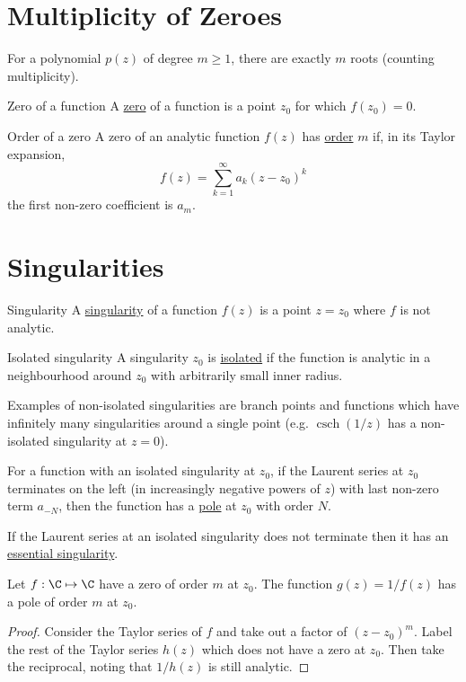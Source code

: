 \documentclass[../Main.tex]{subfiles}
\begin{document}
\section{Multiplicity of Zeroes}
\begin{theorem}
    For a polynomial $p(z)$ of degree $m \geq 1$, there are exactly $m$ roots (counting multiplicity).
    \label{thmFundamentalAlgebra}
\end{theorem}
\begin{definition}{Zero of a function}
    A \underline{zero} of a function is a point $z_0$ for which $f(z_0) = 0$.
\end{definition}
\begin{definition}{Order of a zero}
    A zero of an analytic function $f(z)$ has \underline{order} $m$ if, in its Taylor expansion,
    \begin{equation*}
        f(z) = \sum_{k=1}^{\infty} a_k (z - z_0)^k
    \end{equation*}
    the first non-zero coefficient is $a_m$.
\end{definition}
\section{Singularities}
\begin{definition}{Singularity}
    A \underline{singularity} of a function $f(z)$ is a point $z = z_0$ where $f$ is not analytic.
\end{definition}
\begin{definition}{Isolated singularity}
    A singularity $z_0$ is \underline{isolated} if the function is analytic in a neighbourhood around $z_0$ with arbitrarily small inner radius.
\end{definition}
Examples of non-isolated singularities are branch points and functions which have infinitely many singularities around a single point (e.g. $\operatorname{csch}(1/z)$ has a non-isolated singularity at $z = 0$).

For a function with an isolated singularity at $z_0$, if the Laurent series at $z_0$ terminates on the left (in increasingly negative powers of $z$) with last non-zero term $a_{-N}$, then the function has a \underline{pole} at $z_0$ with order $N$.

If the Laurent series at an isolated singularity does not terminate then it has an \underline{essential singularity}.
\begin{proposition}
    Let $f : \C \mapsto \C$ have a zero of order $m$ at $z_0$. The function $g(z) = 1 / f(z)$ has a pole of order $m$ at $z_0$.
    \label{propRecipSing}
\end{proposition}
\begin{proof}
    Consider the Taylor series of $f$ and take out a factor of $(z - z_0)^m$. Label the rest of the Taylor series $h(z)$ which does not have a zero at $z_0$. Then take the reciprocal, noting that $1 / h(z)$ is still analytic.
\end{proof}
\end{document}
